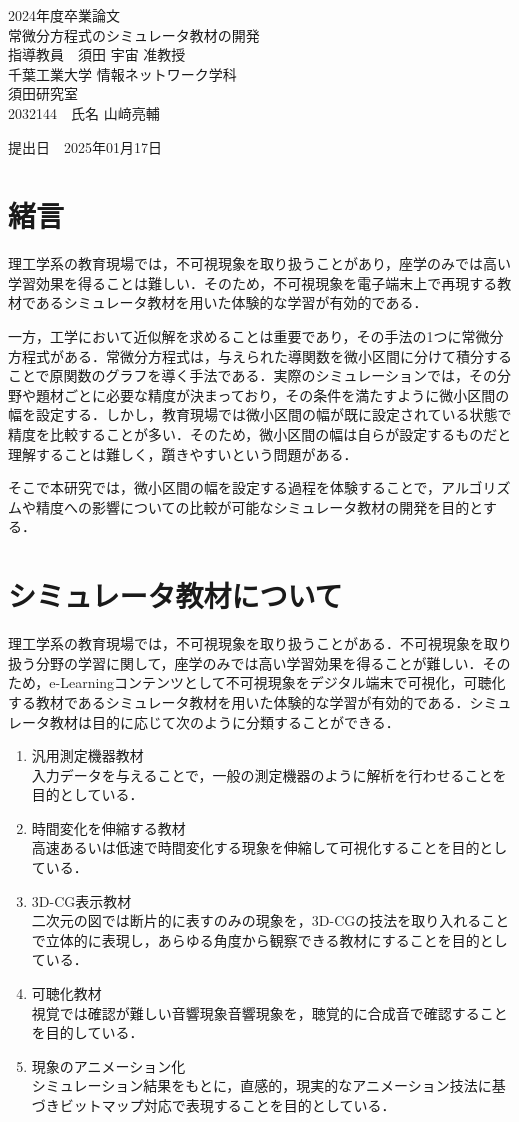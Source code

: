 \documentclass[a4paper, 12pt]{ltjsarticle}
\newcommand{\coverpage}{
\begin{titlepage}
\begin{center}
\vspace*{1.5cm}

{\LARGE 2024年度卒業論文}\\[2cm] %

{\Huge {常微分方程式のシミュレータ教材の開発}}\\[4cm] %

{\LARGE 指導教員　須田 宇宙 准教授}\\[2cm] %
{\LARGE 千葉工業大学 情報ネットワーク学科}\\[0.5cm] %

{\LARGE 須田研究室}\\[2.5cm] %

{\LARGE {2032144}　氏名 {山﨑亮輔}} \\[1.5cm] %

\vfill
\end{center}

\begin{flushright}
{\LARGE 提出日　\textnormal{2025年01月17日}}\\[1.5cm] %
\end{flushright}

\vfill
\end{titlepage}
}
\begin{document}
\coverpage

\tableofcontents

\clearpage

\section{緒言}
理工学系の教育現場では，不可視現象を取り扱うことがあり，座学のみでは高い学習効果を得ることは難しい．そのため，不可視現象を電子端末上で再現する教材であるシミュレータ教材を用いた体験的な学習が有効的である\cite{suda2018}．

一方，工学において近似解を求めることは重要であり，その手法の1つに常微分方程式がある．常微分方程式は，与えられた導関数を微小区間に分けて積分することで原関数のグラフを導く手法である．実際のシミュレーションでは，その分野や題材ごとに必要な精度が決まっており，その条件を満たすように微小区間の幅を設定する．しかし，教育現場では微小区間の幅が既に設定されている状態で精度を比較することが多い．そのため，微小区間の幅は自らが設定するものだと理解することは難しく，躓きやすいという問題がある．

そこで本研究では，微小区間の幅を設定する過程を体験することで，アルゴリズムや精度への影響についての比較が可能なシミュレータ教材の開発を目的とする．
\clearpage
\section{シミュレータ教材について}
理工学系の教育現場では，不可視現象を取り扱うことがある．不可視現象を取り扱う分野の学習に関して，座学のみでは高い学習効果を得ることが難しい．そのため，e-Learningコンテンツとして不可視現象をデジタル端末で可視化，可聴化する教材であるシミュレータ教材を用いた体験的な学習が有効的である．シミュレータ教材は目的に応じて次のように分類することができる．
\begin{enumerate}
\item 汎用測定機器教材\\
入力データを与えることで，一般の測定機器のように解析を行わせることを目的としている．
\item 時間変化を伸縮する教材\\
高速あるいは低速で時間変化する現象を伸縮して可視化することを目的としている．
\item 3D-CG表示教材\\
二次元の図では断片的に表すのみの現象を，3D-CGの技法を取り入れることで立体的に表現し，あらゆる角度から観察できる教材にすることを目的としている．
\item 可聴化教材\\
視覚では確認が難しい音響現象音響現象を，聴覚的に合成音で確認することを目的している．
\item 現象のアニメーション化\\
シミュレーション結果をもとに，直感的，現実的なアニメーション技法に基づきビットマップ対応で表現することを目的としている．
\end{enumerate}
\clearpage
\end{document}
